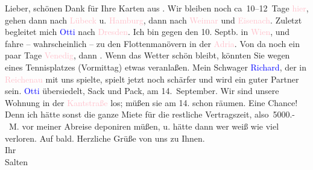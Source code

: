 \pstart
           Lieber, schönen Dank für Ihre Karten aus \label{K_L03433-1v}\label{K_L03433-1h}. Wir bleiben noch
               ca 10–12 Tage \textcolor{pink}{hier}{}\ledrightnote{{$\rightarrow$}\textcolor{pink}{Bansin}}, gehen
               dann nach \textcolor{pink}{Lübeck}{}\ledrightnote{\textcolor{pink}{Lübeck}} u. \textcolor{pink}{Hamburg}{}\ledrightnote{\textcolor{pink}{Hamburg}}, dann nach \textcolor{pink}{Weimar}{}\ledrightnote{\textcolor{pink}{Weimar}}
               und \textcolor{pink}{Eisenach}{}\ledrightnote{\textcolor{pink}{Eisenach}}. Zuletzt begleitet mich \textcolor{blue}{Otti}{}\ledrightnote{\textcolor{blue}{Ottilie Salten}} nach \textcolor{pink}{Dresden}{}\ledrightnote{\textcolor{pink}{Dresden}}. Ich bin gegen den 10. Septb. in \textcolor{pink}{Wien}{}\ledrightnote{\textcolor{pink}{Wien}}, und fahre – wahrscheinlich – zu den
               Flottenmanövern in der \textcolor{pink}{Adria}{}\ledrightnote{\textcolor{pink}{Adriatisches Meer}}. Von da noch ein
               paar Tage \textcolor{pink}{Venedig}{}\ledrightnote{\textcolor{pink}{Venedig}}, dann \label{K_L03433-2v}\label{K_L03433-2h}. Wenn das Wetter schön bleibt, könnten Sie
               wegen eines Tennisplatzes (Vormittag) etwas veranlaßen. Mein Schwager \textcolor{blue}{Richard}{}\ledrightnote{\textcolor{blue}{Richard Metzl}}, der in \textcolor{pink}{Reichenau}{}\ledrightnote{\textcolor{pink}{Reichenau an der Rax}} mit uns spielte, spielt jetzt noch schärfer und wird ein guter
               Partner sein. \textcolor{blue}{Otti}{}\ledrightnote{\textcolor{blue}{Ottilie Salten}} übersiedelt, Sack und Pack,
               am 14. September. Wir sind unsere Wohnung in der \textcolor{pink}{Kantstraße}{}\ledrightnote{\textcolor{pink}{Kantstraße}} los; müßen sie am 14. schon räumen. Eine Chance! Denn ich hätte sonst die
               ganze Miete für die restliche Vertragszeit, also 5000.- M. vor meiner Abreise
               deponiren müßen, u. hätte dann wer weiß wie viel verloren. Auf bald. Herzliche Grüße
               von uns zu Ihnen. {\\}Ihr {\\}\spacefill\mbox{Salten}\pend
           \endnumbering{}  
      